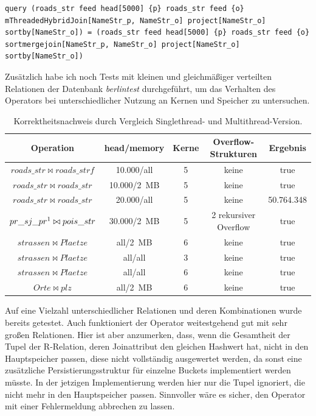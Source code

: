 \documentclass[a4paper,12pt,twoside]{article}
\newcommand{\Fb}[1]{\textit{#1}} %
\begin{document}
\begin{minipage}{0.95\textwidth}
	\begin{lstlisting}[caption={Beispiel Testqueries für den Join-Operator.}, label=list:testjoin]
	query (roads_str feed head[5000] {p} roads_str feed {o} mThreadedHybridJoin[NameStr_p, NameStr_o] project[NameStr_o] sortby[NameStr_o]) = (roads_str feed head[5000] {p} roads_str feed {o} sortmergejoin[NameStr_p, NameStr_o] project[NameStr_o] sortby[NameStr_o])
	\end{lstlisting}
\end{minipage}

Zusätzlich habe ich noch Tests mit kleinen und gleichmäßiger verteilten Relationen der Datenbank \Fb{berlintest} durchgeführt, um das Verhalten des Operators bei unterschiedlicher Nutzung an Kernen und Speicher zu untersuchen. 

\begin{table}
	\centering
	\begin{tabular}{|c|c|c|c|c|}
		\hline
		\rowcolor{gray!30}
		Operation & head/memory & Kerne & Overflow-Strukturen & Ergebnis \\ 
		\hline 
		$roads\_str \bowtie roads\_strf$ & 10.000/all & 5 & keine & true \\ 
		\hline 
		$roads\_str \bowtie roads\_str$ & 10.000/2~MB & 5 & keine & true \\ 
		\hline 
		$roads\_str \bowtie roads\_str$ & 20.000/all & 5 & keine & 50.764.348 \\ 
		\hline 
		$pr\_sj\_pr\footnotemark \bowtie pois\_str$ & 30.000/2~MB & 5 & 2 rekursiver Overflow & true \\ 
		\hline 
		$strassen \bowtie Plaetze$ & all/2~MB & 6 & keine  & true \\ 
		\hline
		$strassen \bowtie Plaetze$ & all/all & 3 & keine & true \\ 
		\hline
		$strassen \bowtie Plaetze$ & all/all & 6 & keine & true \\ 
		\hline
		$Orte \bowtie plz$ & all/2~MB & 6 & keine & true \\ 
		\hline
	\end{tabular}
	\caption{\label{tab:testJoin} Korrektheitsnachweis durch Vergleich Singlethread- und Multithread-Version.}
\end{table}


Auf eine Vielzahl unterschiedlicher Relationen und deren Kombinationen wurde bereits getestet. Auch funktioniert der Operator weitestgehend gut mit sehr großen Relationen. Hier ist aber anzumerken, dass, wenn die Gesamtheit der Tupel der R-Relation, deren Joinattribut den gleichen Hashwert hat, nicht in den Hauptspeicher passen, diese nicht vollständig ausgewertet werden, da sonst eine zusätzliche Persistierungsstruktur für einzelne Buckets implementiert werden müsste. In der jetzigen Implementierung werden hier nur die Tupel ignoriert, die nicht mehr in den Hauptspeicher passen. Sinnvoller wäre es sicher, den Operator mit einer Fehlermeldung abbrechen zu lassen.
\end{document}
